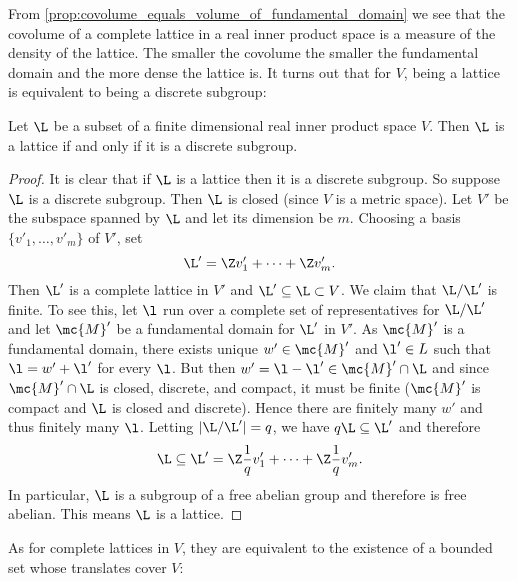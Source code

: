     From \cref{prop:covolume_equals_volume_of_fundamental_domain} we see that the covolume of a complete lattice in a real inner product space is a measure of the density of the lattice. The smaller the covolume the smaller the fundamental domain and the more dense the lattice is. It turns out that for $V$, being a lattice is equivalent to being a discrete subgroup:

    \begin{proposition}\label{prop:lattice_if_and_only_if_discrete_subgroup}
      Let $\L$ be a subset of a finite dimensional real inner product space $V$. Then $\L$ is a lattice if and only if it is a discrete subgroup.
    \end{proposition}
    \begin{proof}
      It is clear that if $\L$ is a lattice then it is a discrete subgroup. So suppose $\L$ is a discrete subgroup. Then $\L$ is closed (since $V$ is a metric space). Let $V'$ be the subspace spanned by $\L$ and let its dimension be $m$. Choosing a basis $\{v'_{1},\ldots,v'_{m}\}$ of $V'$, set
      \[
        \L' = \Z v'_{1}+\cdots+\Z v'_{m}.
      \]
      Then $\L'$ is a complete lattice in $V'$ and $\L' \subseteq \L \subset V$. We claim that $\L/\L'$ is finite. To see this, let $\l$ run over a complete set of representatives for $\L/\L'$ and let $\mc{M}'$ be a fundamental domain for $\L'$ in $V'$. As $\mc{M}'$ is a fundamental domain, there exists unique $w' \in \mc{M}'$ and $\l' \in L$ such that $\l = w'+\l'$ for every $\l$. But then $w' = \l-\l' \in \mc{M}' \cap \L$ and since $\mc{M}' \cap \L$ is closed, discrete, and compact, it must be finite ($\mc{M}'$ is compact and $\L$ is closed and discrete). Hence there are finitely many $w'$ and thus finitely many $\l$. Letting $|\L/\L'| = q$, we have $q\L \subseteq \L'$ and therefore
      \[
        \L \subseteq \L' = \Z\frac{1}{q}v'_{1}+\cdots+\Z\frac{1}{q}v'_{m}.
      \]
      In particular, $\L$ is a subgroup of a free abelian group and therefore is free abelian. This means $\L$ is a lattice.
    \end{proof}

    As for complete lattices in $V$, they are equivalent to the existence of a bounded set whose translates cover $V$:

